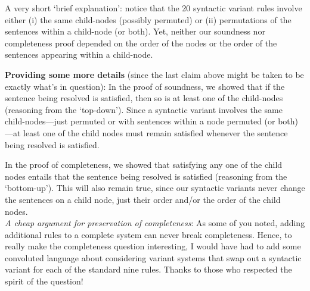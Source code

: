 \documentclass[12pt]{article}
\newcommand*{\metav}[1]{\ensuremath{\mathcal{#1}}}
\begin{document}
\begin{enumerate}

A very short `brief explanation': notice that the 20 syntactic variant rules involve either (i) the same child-nodes (possibly permuted) or (ii) permutations of the sentences within a child-node (or both). Yet, neither our soundness nor completeness proof depended on the order of the nodes or the order of the sentences appearing within a child-node. 

\textbf{Providing some more details} (since the last claim above might be taken to be exactly what's in question): In the proof of soundness, we showed that if the sentence being resolved is satisfied, then so is at least one of the child-nodes (reasoning from the `top-down'). Since a syntactic variant involves the same child-nodes---just permuted or with sentences within a node permuted (or both)---at least one of the child nodes must remain satisfied whenever the sentence being resolved is satisfied. 

In the proof of completeness, we showed that satisfying any one of the child nodes entails that the sentence being resolved is satisfied (reasoning from the `bottom-up'). This will also remain true, since our syntactic variants never change the sentences on a child node, just their order and/or the order of the child nodes. \\

\textit{A cheap argument for preservation of completeness}: As some of you noted, adding additional rules to a complete system can never break completeness. Hence, to really make the completeness question interesting, I would have had to add some convoluted language about considering variant systems that swap out a syntactic variant for each of the standard nine rules. Thanks to those who respected the spirit of the question! 




\end{enumerate}
\end{document}

